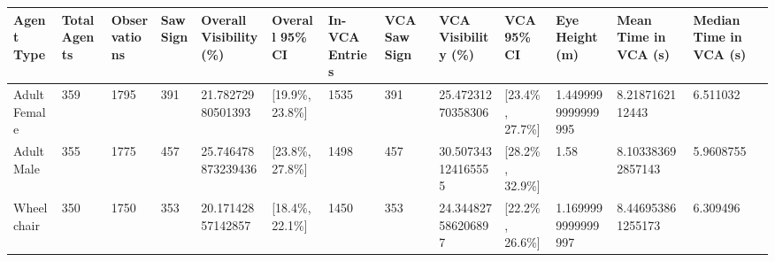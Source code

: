 \begin{tabular}{lllllllllllll}
\hline
Agent Type & Total Agents & Observations & Saw Sign & Overall Visibility (\%) & Overall 95\% CI & In-VCA Entries & VCA Saw Sign & VCA Visibility (\%) & VCA 95\% CI & Eye Height (m) & Mean Time in VCA (s) & Median Time in VCA (s) \\ \hline
Adult Female & 359 & 1795 & 391 & 21.78272980501393 & [19.9\%, 23.8\%] & 1535 & 391 & 25.47231270358306 & [23.4\%, 27.7\%] & 1.4499999999999995 & 8.2187162112443 & 6.511032 \\
Adult Male & 355 & 1775 & 457 & 25.746478873239436 & [23.8\%, 27.8\%] & 1498 & 457 & 30.507343124165555 & [28.2\%, 32.9\%] & 1.58 & 8.103383692857143 & 5.9608755 \\
Wheelchair & 350 & 1750 & 353 & 20.17142857142857 & [18.4\%, 22.1\%] & 1450 & 353 & 24.344827586206897 & [22.2\%, 26.6\%] & 1.1699999999999997 & 8.446953861255173 & 6.309496 \\
\hline
\end{tabular}
